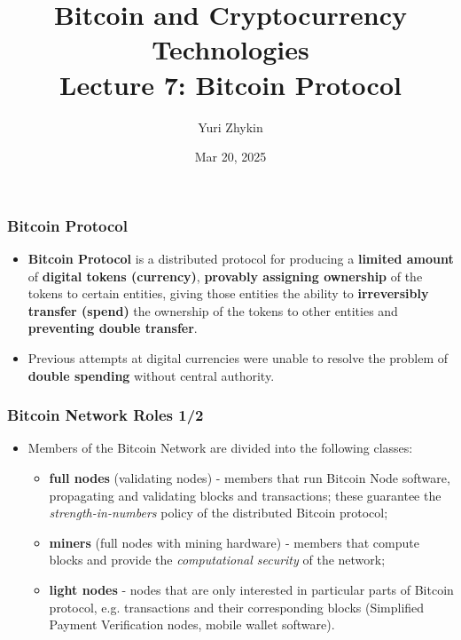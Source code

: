 \documentclass{beamer}
\title{
  Bitcoin and Cryptocurrency Technologies \\
  Lecture 7: Bitcoin Protocol
}
\author{Yuri Zhykin}
\date{Mar 20, 2025}
\begin{document}
\frame{\titlepage}

\begin{frame}
  \frametitle{Bitcoin Protocol}
  \begin{itemize}
  \item \textbf{Bitcoin Protocol} is a distributed protocol for producing a
    \textbf{limited amount} of \textbf{digital tokens (currency)},
    \textbf{provably assigning ownership} of the tokens to certain entities,
    giving those entities the ability to \textbf{irreversibly transfer (spend)}
    the ownership of the tokens to other entities and \textbf{preventing double
      transfer}.
  \item Previous attempts at digital currencies were unable to resolve the
    problem of \textbf{double spending} without central authority.
  \end{itemize}
\end{frame}

\begin{frame}
  \frametitle{Bitcoin Network Roles 1/2}
  \begin{itemize}
  \item Members of the Bitcoin Network are divided into the following classes:
    \begin{itemize}
    \item \textbf{full nodes} (validating nodes) - members that run Bitcoin Node
      software, propagating and validating blocks and transactions; these
      guarantee the \textit{strength-in-numbers} policy of the distributed
      Bitcoin protocol;
    \item \textbf{miners} (full nodes with mining hardware) - members that
      compute blocks and provide the \textit{computational security} of the
      network;
    \item \textbf{light nodes} - nodes that are only interested in particular
      parts of Bitcoin protocol, e.g. transactions and their corresponding
      blocks (Simplified Payment Verification nodes, mobile wallet software).
    \end{itemize}
  \end{itemize}
\end{frame}
\end{document}

